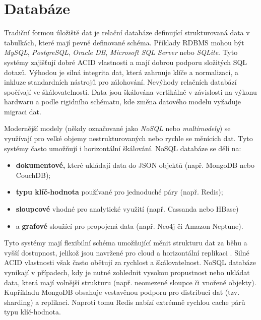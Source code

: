 \section{Databáze}
\label{sec:research-db}

Tradiční formou úložiště dat je relační databáze definující strukturovaná
data v tabulkách, které mají pevně definované schéma. Příklady RDBMS mohou
být \emph{MySQL}, \emph{PostgreSQL}, \emph{Oracle DB}, \emph{Microsoft
SQL Server} nebo \emph{SQLite}. Tyto systémy zajišťují dobré ACID vlastnosti
a mají dobrou podporu složitých SQL dotazů. Výhodou je silná integrita dat,
která zahrnuje klíče a normalizaci, a inkluze standardních nástrojů
pro zálohování. Nevýhody relačních databází spočívají ve škálovatelnosti.
Data jsou škálována vertikálně v závislosti na výkonu hardwaru a podle
rigidního schématu, kde změna datového modelu vyžaduje migraci dat.
\cite{YHVfLHsNlUItkF6G,Fny73hg0lVaoqYAl} %

Modernější modely (někdy označované jako \emph{NoSQL} nebo
\emph{multimodely}) se využívají pro velké objemy nestrukturovaných nebo
rychle se měnících dat. Tyto systémy často umožňují i horizontální
škálování. NoSQL databáze se dělí na:

\begin{itemize}
    \item \textbf{dokumentové,} které ukládají data do JSON objektů
        (např. MongoDB nebo CouchDB);
    \item \textbf{typu klíč-hodnota} používané pro jednoduché páry
        (např. Redis);
    \item \textbf{sloupcové} vhodné pro analytické využití
        (např. Cassanda nebo HBase)
    \item a \textbf{grafové} sloužící pro propojená data
        (např. Neo4j či Amazon Neptune).
\end{itemize}

Tyto systémy mají flexibilní schéma umožňující měnit strukturu dat
za běhu a vyšší dostupnost, jelikož jsou navržené pro cloud a horizontální
replikaci \cite{YHVfLHsNlUItkF6G,Fny73hg0lVaoqYAl}. %
Silné ACID vlastnosti však často obětují za rychlost a škálovatelnost.
NoSQL databáze vynikají v případech, kdy je nutné zohlednit vysokou
propustnost nebo ukládat data, která mají volnější strukturu
(např. neomezené sloupce či vnořené objekty). Kupříkladu MongoDB obsahuje
vestavěnou podporu pro distribuci dat (tzv. sharding) a replikaci.
Naproti tomu Redis nabízí extrémně rychlou cache párů typu klíč-hodnota.

